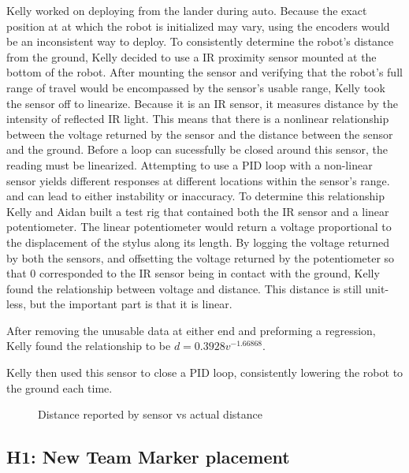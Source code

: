 \documentclass{article}
\begin{document}
Kelly worked on deploying from the lander during auto. Because the exact position at at which the robot is initialized may vary, using the encoders would be an inconsistent way to deploy. To consistently determine the robot's distance from the ground, Kelly decided to use a IR proximity sensor mounted at the bottom of the robot. After mounting the sensor and verifying that the robot's full range of travel would be encompassed by the sensor's usable range, Kelly took the sensor off to linearize. Because it is an IR sensor, it measures distance by the intensity of reflected IR light. This means that there is a nonlinear relationship between the voltage returned by the sensor and the distance between the sensor and the ground. Before a loop can sucessfully be closed around this sensor, the reading must be linearized. Attempting to use a PID loop with a non-linear sensor yields different responses at different locations within the sensor's range. and can lead to either instability or inaccuracy. To determine this relationship Kelly and Aidan built a test rig that contained both the IR sensor and a linear potentiometer. The linear potentiometer would return a voltage proportional to the displacement of the stylus along its length. By logging the voltage returned by both the sensors, and offsetting the voltage returned by the potentiometer so that 0 corresponded to the IR sensor being in contact with the ground, Kelly found the relationship between voltage and distance. This distance is still unit-less, but the important part is that it is linear.

After removing the unusable data at either end and preforming a regression, Kelly found the relationship to be $d=0.3928 v^{-1.66868}$. 

Kelly then used this sensor to close a PID loop, consistently lowering the robot to the ground each time.


\begin {figure}
\centering
{}
\caption {Distance reported by sensor vs actual distance}
\label {fig:graph}
\end{figure}
\subsection{H1: New Team Marker placement}
\end{document}

